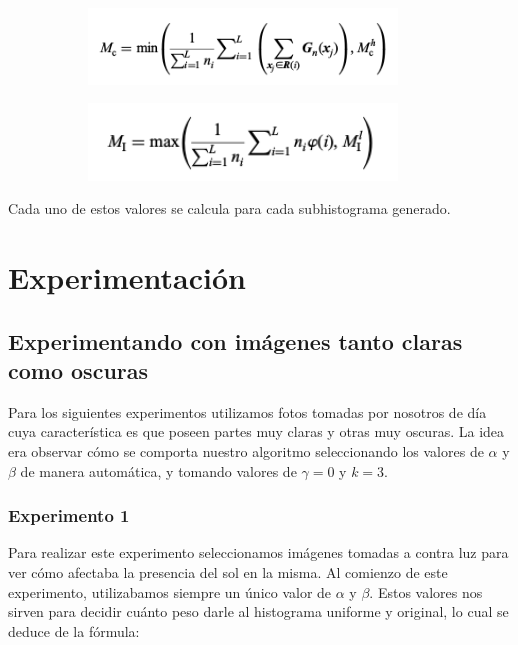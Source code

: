 \documentclass[10pt, a4paper]{article}
\begin{document}
\begin{figure}[H]
	\centering
    \begin{subfigure}{0.5\textwidth}
        \includegraphics[width=0.9\textwidth]{calculo-Mc.png}
    \end{subfigure}\hfill
    \begin{subfigure}{0.5\textwidth}
        \includegraphics[width=0.9\textwidth]{calculo_Mi.png}
    \end{subfigure}\hfill
\end{figure}

Cada uno de estos valores se calcula para cada subhistograma generado.

\section{Experimentación}

\subsection{Experimentando con imágenes tanto claras como oscuras}

Para los siguientes experimentos utilizamos fotos tomadas por nosotros de día cuya característica es que poseen partes muy claras y otras muy oscuras. La idea era observar cómo se comporta nuestro algoritmo seleccionando los valores de $\alpha$ y $\beta$ de manera automática, y tomando valores de $\gamma = 0$ y $k=3$. 

\subsubsection{Experimento 1}

Para realizar este experimento seleccionamos imágenes tomadas a contra luz para ver cómo afectaba la presencia del sol en la misma. Al comienzo de este experimento, utilizabamos siempre un único valor de $\alpha$ y $\beta$. Estos valores  nos sirven para decidir cuánto peso darle al histograma uniforme y  original, lo cual se deduce de la fórmula:
\end{document}
